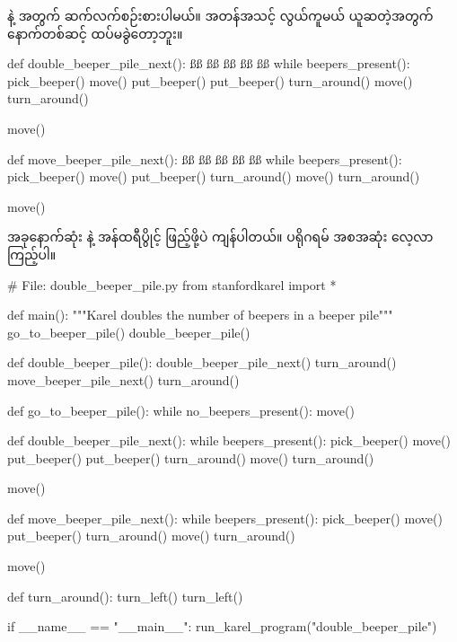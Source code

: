  နဲ့   အတွက် ဆက်လက်စဉ်းစားပါမယ်။ အတန်အသင့် လွယ်ကူမယ် ယူဆတဲ့အတွက် နောက်တစ်ဆင့် ထပ်မခွဲတော့ဘူး။
%
\begin{py}
def double_beeper_pile_next():
    ßß
    ßß
    ßß
    ßß
    ßß
    while beepers_present():
        pick_beeper()
        move()
        put_beeper()
        put_beeper()
        turn_around()
        move()
        turn_around()

    move()
\end{py}
%
%
\begin{py}
def move_beeper_pile_next():
    ßß
    ßß
    ßß
    ßß
    ßß
    while beepers_present():
        pick_beeper()
        move()
        put_beeper()
        turn_around()
        move()
        turn_around()

    move()
\end{py}
%
အခုနောက်ဆုံး \fEn{,}  နဲ့ အန်ထရီပွိုင့် ဖြည့်ဖို့ပဲ ကျန်ပါတယ်။ ပရိုဂရမ် အစအဆုံး လေ့လာကြည့်ပါ။ 
%
\begin{py}
# File: double_beeper_pile.py
from stanfordkarel import *


def main():
    """Karel doubles the number of beepers in a beeper pile"""
    go_to_beeper_pile()
    double_beeper_pile()


def double_beeper_pile():
    double_beeper_pile_next()
    turn_around()
    move_beeper_pile_next()
    turn_around()


def go_to_beeper_pile():
    while no_beepers_present():
        move()


def double_beeper_pile_next():
    while beepers_present():
        pick_beeper()
        move()
        put_beeper()
        put_beeper()
        turn_around()
        move()
        turn_around()

    move()


def move_beeper_pile_next():
    while beepers_present():
        pick_beeper()
        move()
        put_beeper()
        turn_around()
        move()
        turn_around()

    move()


def turn_around():
    turn_left()
    turn_left()


if __name__ == "__main__":
    run_karel_program("double_beeper_pile")
\end{py}
%
\clearpage
